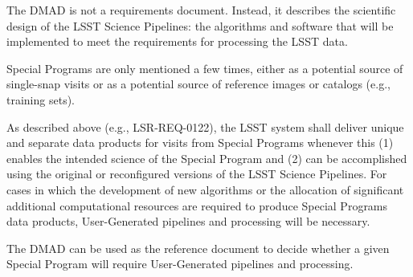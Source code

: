 {{The DMAD is not a requirements document.
Instead, it describes the scientific design of the LSST Science Pipelines: the algorithms and software that will be implemented to meet the requirements for processing the LSST data. 

Special Programs are only mentioned a few times, either as a potential source of single-snap visits or as a potential source of reference images or catalogs (e.g., training sets).

As described above (e.g., LSR-REQ-0122), the LSST system shall deliver unique and separate data products for visits from Special Programs whenever this (1) enables the intended science of the Special Program and (2) can be accomplished using the original or reconfigured versions of the LSST Science Pipelines.
For cases in which the development of new algorithms or the allocation of significant additional computational resources are required to produce Special Programs data products, User-Generated pipelines and processing will be necessary.

The DMAD can be used as the reference document to decide whether a given Special Program will require User-Generated pipelines and processing.



}}
